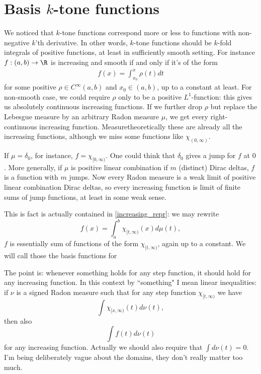 \section{Basis $k$-tone functions}

We noticed that $k$-tone functions correspond more or less to functions with non-negative $k$'th derivative. In other words, $k$-tone functions should be $k$-fold integrals of positive functions, at least in sufficiently smooth setting. For instance $f : (a, b) \to \R$ is increasing and smooth if and only if it's of the form
\begin{align}\label{increasing_repr}
	f(x) = \int_{x_{0}}^{x} \rho(t) dt
\end{align}
for some positive $\rho \in C^{\infty}(a, b)$ and $x_{0} \in (a, b)$, up to a constant at least. For non-smooth case, we could require $\rho$ only to be a positive $L^{1}$-function: this gives us absolutely continuous increasing functions. If we further drop $\rho$ but replace the Lebesgue measure by an arbitrary Radon measure $\mu$, we get every right-continuous increasing function. Measuretheoretically these are already all the increasing functions, although we miss some functions like $\chi_{(0, \infty)}$.

If $\mu = \delta_{0}$, for instance, $f = \chi_{[0, \infty)}$. One could think that $\delta_{0}$ gives a jump for $f$ at $0$. More generally, if $\mu$ is positive linear combination if $m$ (distinct) Dirac deltas, $f$ is a function with $m$ jumps. Now every Radon measure is a weak limit of positive linear combination Dirac deltas, so every increasing function is limit of finite sums of jump functions, at least in some weak sense.

This is fact is actually contained in \ref{increasing_repr}: we may rewrite
\[
	f(x) = \int_{a}^{b} \chi_{[t, \infty)}(x)d\mu(t),
\]
$f$ is essentially sum of functions of the form $\chi_{[t, \infty)}$, again up to a constant. We will call those the basis functions for

The point is: whenever something holds for any step function, it should hold for any increasing function. In this context by ``something" I mean linear inequalities: if $\nu$ is a signed Radon measure such that for any step function $\chi_{[t, \infty)}$ we have
\[
	\int \chi_{[x, \infty)}(t) d \nu(t),
\]
then also
\[
	\int f(t) d \nu(t)
\]
for any increasing function. Actually we should also require that $\int d \nu(t) = 0$. I'm being deliberately vague about the domains, they don't really matter too much.

